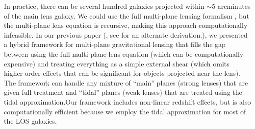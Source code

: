 In practice, there can be several hundred galaxies projected within $\sim5$ arcminutes of the main lens galaxy. We could use the full multi-plane lensing formalism \citep{PLW}, but the multi-plane lens equation is recursive, making this approach computationally infeasible.
In our previous paper (\citealp{McCully14}, see \citealt{Schneider14} for an alternate derivation.), we presented a hybrid framework for multi-plane gravitational lensing that fills the gap between using the full multi-plane lens equation (which can be computationally expensive) and treating everything as a simple external shear (which omits higher-order effects that can be significant for objects projected near the lens). The framework can handle any mixture of ``main'' planes (strong lenses) that are given full treatment and ``tidal'' planes (weak lenses) that are treated using the tidal approximation.Our framework includes non-linear redshift effects, but is also computationally efficient because we employ the tidal approximation for most of the LOS galaxies.
  
  